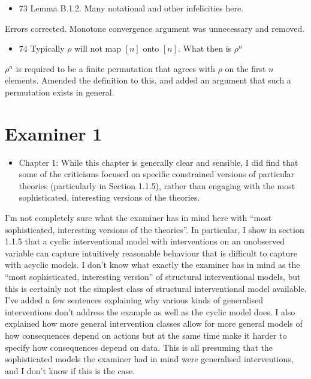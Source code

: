 \documentclass[12pt, a4paper]{article}
\begin{document}
\begin{itemize}
    \item 73 Lemma B.1.2. Many notational and other infelicities here.
\end{itemize}
 
Errors corrected. Monotone convergence argument was unnecessary and removed.

\begin{itemize}
    \item 74 Typically $\rho$ will not map $[n]$ onto $[n]$. What then is $\rho^n$
\end{itemize}
 
$\rho^n$ is required to be a finite permutation that agrees with $\rho$ on the first $n$ elements. Amended the definition to this, and added an argument that such a permutation exists in general.


\section{Examiner 1}

\begin{itemize}
    \item Chapter 1: While this chapter is generally clear and sensible, I did find that some of the criticisms focused on specific constrained versions of particular theories (particularly in Section 1.1.5), rather than engaging with the most sophisticated, interesting versions of the theories.
\end{itemize}

I'm not completely sure what the examiner has in mind here with ``most sophisticated, interesting versions of the theories''. In particular, I show in section 1.1.5 that a cyclic interventional model with interventions on an unobserved variable can capture intuitively reasonable behaviour that is difficult to capture with acyclic models. I don't know what exactly the examiner has in mind as the ``most sophisticated, interesting version'' of structural interventional models, but this is certainly not the simplest class of structural interventional model available. I've added a few sentences explaining why various kinds of generalised interventions don't address the example as well as the cyclic model does. I also explained how more general intervention classes allow for more general models of how consequences depend on actions but at the same time make it harder to specify how consequences depend on data. This is all presuming that the sophisticated models the examiner had in mind were generalised interventions, and I don't know if this is the case.
\end{document}
